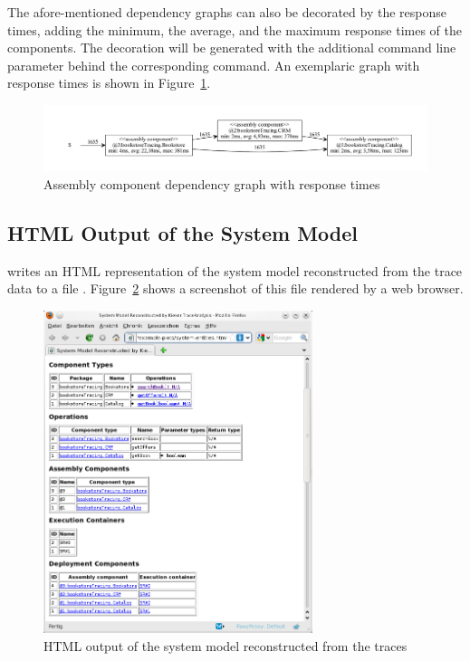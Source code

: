 The afore-mentioned dependency graphs can also be decorated by the response times, adding the minimum, the average, %
and the maximum response times of the components. The decoration will be generated with the additional command line %
parameter  behind the corresponding command.  %
An exemplaric graph with response times is shown in Figure~\ref{fig:appendix:traceAnalysisExample:graphWithRespTimes}.

\begin{figure}[h]
\includegraphics[scale=0.45]{images/assemblyComponentDependencyGraphWithResponseTimes}
\caption{Assembly component dependency graph with response times}
\label{fig:appendix:traceAnalysisExample:graphWithRespTimes}
\end{figure}
   

\pagebreak

\subsection{HTML Output of the System Model}

\KiekerTraceAnalysis{} writes an HTML representation of the system model reconstructed %
from the trace data to a file . %
Figure~\ref{fig:appendix:traceAnalysisExample:htmlSystemModel} shows a screenshot %
of this file rendered by a web browser.

\begin{figure}[h]\centering
\includegraphics[width=0.7\textwidth]{images/system-entities-html-FFscrsh.png}
\caption{HTML output of the system model reconstructed from the traces}
\label{fig:appendix:traceAnalysisExample:htmlSystemModel}
\end{figure}
